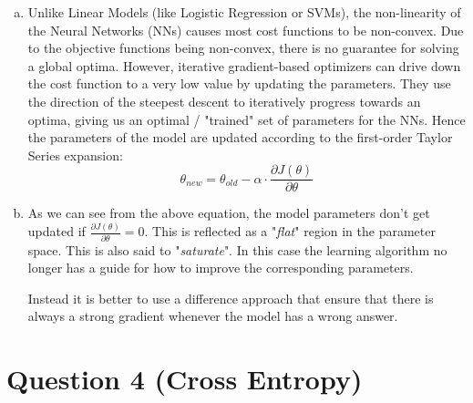 \documentclass[fleqn]{article}
\begin{document}
\begin{enumerate}[a)]
    \item Unlike Linear Models (like Logistic Regression or SVMs), the non-linearity of the Neural Networks (NNs) causes most cost functions to be non-convex. Due to the objective functions being non-convex, there is no guarantee for solving a global optima.  However, iterative gradient-based optimizers can drive down the cost function to a very low value by updating the parameters. They use the direction of the steepest descent to iteratively progress towards an optima, giving us an optimal / "trained" set of parameters for the NNs. Hence the parameters of the model are updated according to the first-order Taylor Series expansion:
    \begin{equation*}
        \theta_{new} = \theta_{old} - \alpha \cdot \frac{\partial J(\theta)}{\partial \theta}
    \end{equation*}
    
    
    \item 
    
    As we can see from the above equation, the model parameters don't get updated if $\frac{\partial J(\theta)}{\partial \theta} = 0$. This is reflected as a "\textit{flat}" region in the parameter space. This is also said to "\textit{saturate}". In this case the learning algorithm no longer has a guide for how to improve the corresponding parameters.
    
    \vspace{40 mm}
    
    Instead it is better to use a difference approach that ensure that there is always a strong gradient whenever the model has a wrong answer.
    
    \vspace{40 mm}
\end{enumerate}

\section*{Question 4 (Cross Entropy)}
\end{document}
